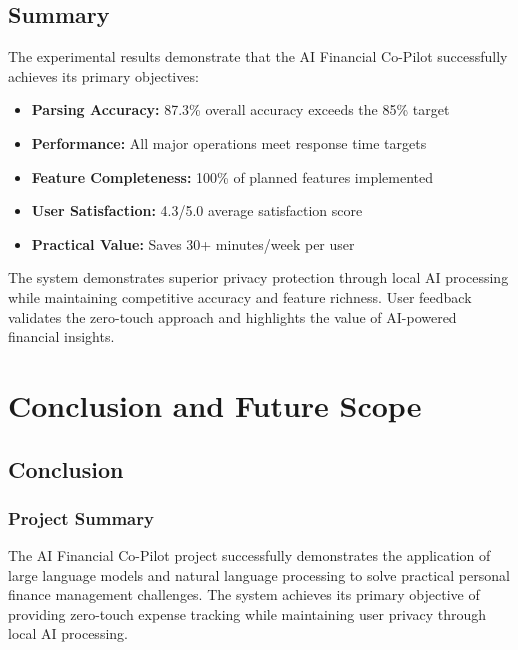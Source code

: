 \documentclass[11pt,a4paper]{report}
\begin{document}
\section{Summary}

The experimental results demonstrate that the AI Financial Co-Pilot successfully achieves its primary objectives:

\begin{itemize}
    \item \textbf{Parsing Accuracy:} 87.3\% overall accuracy exceeds the 85\% target
    \item \textbf{Performance:} All major operations meet response time targets
    \item \textbf{Feature Completeness:} 100\% of planned features implemented
    \item \textbf{User Satisfaction:} 4.3/5.0 average satisfaction score
    \item \textbf{Practical Value:} Saves 30+ minutes/week per user
\end{itemize}

The system demonstrates superior privacy protection through local AI processing while maintaining competitive accuracy and feature richness. User feedback validates the zero-touch approach and highlights the value of AI-powered financial insights.

\chapter{Conclusion and Future Scope}

\section{Conclusion}

\subsection{Project Summary}

The AI Financial Co-Pilot project successfully demonstrates the application of large language models and natural language processing to solve practical personal finance management challenges. The system achieves its primary objective of providing zero-touch expense tracking while maintaining user privacy through local AI processing.
\end{document}
